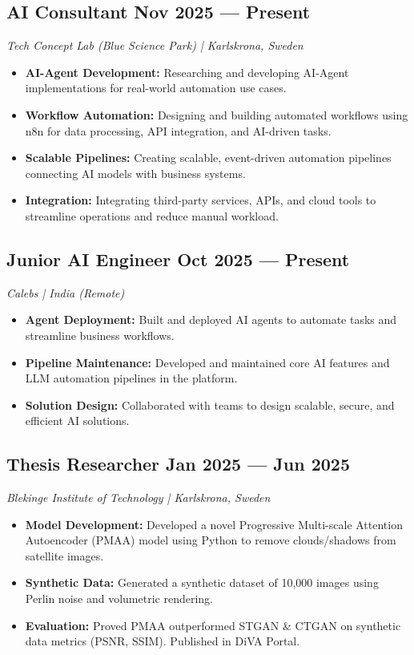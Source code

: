 \documentclass[11pt, a4paper]{article}
\begin{document}
\subsection*{AI Consultant \hfill Nov 2025 --- Present}
\textit{Tech Concept Lab (Blue Science Park) | Karlskrona, Sweden}
\begin{itemize}
    \item \textbf{AI-Agent Development:} Researching and developing AI-Agent implementations for real-world automation use cases.
    \item \textbf{Workflow Automation:} Designing and building automated workflows using n8n for data processing, API integration, and AI-driven tasks.
    \item \textbf{Scalable Pipelines:} Creating scalable, event-driven automation pipelines connecting AI models with business systems.
    \item \textbf{Integration:} Integrating third-party services, APIs, and cloud tools to streamline operations and reduce manual workload.
\end{itemize}

\subsection*{Junior AI Engineer \hfill Oct 2025 --- Present}
\textit{Calebs | India (Remote)}
\begin{itemize}
    \item \textbf{Agent Deployment:} Built and deployed AI agents to automate tasks and streamline business workflows.
    \item \textbf{Pipeline Maintenance:} Developed and maintained core AI features and LLM automation pipelines in the platform.
    \item \textbf{Solution Design:} Collaborated with teams to design scalable, secure, and efficient AI solutions.
\end{itemize}

\subsection*{Thesis Researcher \hfill Jan 2025 --- Jun 2025}
\textit{Blekinge Institute of Technology | Karlskrona, Sweden}
\begin{itemize}
    \item \textbf{Model Development:} Developed a novel Progressive Multi-scale Attention Autoencoder (PMAA) model using Python to remove clouds/shadows from satellite images.
    \item \textbf{Synthetic Data:} Generated a synthetic dataset of 10,000 images using Perlin noise and volumetric rendering.
    \item \textbf{Evaluation:} Proved PMAA outperformed STGAN \& CTGAN on synthetic data metrics (PSNR, SSIM). Published in DiVA Portal.
\end{itemize}
\end{document}
